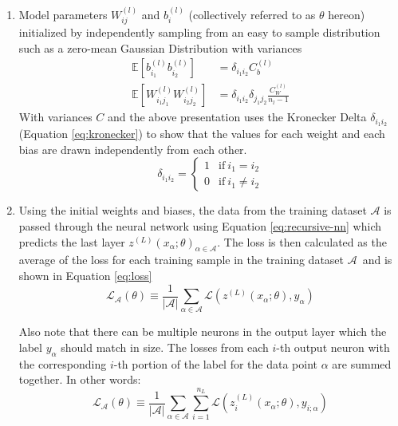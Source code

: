 \begin{enumerate}
    \item Model parameters $W_{ij}^{(l)}$ and $b_i^{(l)}$ (collectively referred to as $\theta$ hereon) initialized by independently sampling from an easy to sample distribution such as a zero-mean Gaussian Distribution with variances
    \begin{equation}
        \begin{split}
            \mathbb{E}[b_{i_1}^{(l)}b_{i_2}^{(l)}] &= \delta_{i_1 i_2} C_b^{(l)} \\
            \mathbb{E}[W_{i_1 j_1}^{(l)}W_{i_2 j_2}^{(l)}] &= \delta_{i_1 i_2} \delta_{j_1 j_2} \frac{C_W^{(l)}}{n_l - 1}
        \end{split}
    \end{equation}
    With variances $C$ and the above presentation uses the Kronecker Delta $\delta_{i_1 i_2}$ (Equation \ref{eq:kronecker}) to show that the values for each weight and each bias are drawn independently from each other.
    \begin{equation}
        \label{eq:kronecker}
        \delta_{i_1 i_2} = \begin{cases}
            1 & \text{if} \: i_1 = i_2 \\
            0 & \text{if} \: i_1 \neq i_2
        \end{cases}
    \end{equation}

    \item Using the initial weights and biases, the data from the training dataset $\mathcal{A}$ is passed through the neural network using Equation \ref{eq:recursive-nn} which predicts the last layer $z^{(L)}(x_\alpha;\theta)_{\alpha \in \mathcal{A}}$. The loss is then calculated as the average of the loss for each training sample in the training dataset $\mathcal{A}$\ and is shown in Equation \ref{eq:loss}     
    \begin{equation}
        \label{eq:loss}
        \mathcal{L}_{\mathcal{A}}(\theta) \equiv \frac{1}{|\mathcal{A}|} \sum_{\alpha \in \mathcal{A}}\mathcal{L}\left( z^{(L)}(x_\alpha;\theta), y_\alpha \right)
    \end{equation}

    Also note that there can be multiple neurons in the output layer which the label $y_\alpha$ should match in size. The losses from each $i$-th output neuron with the corresponding $i$-th portion of the label for the data point $\alpha$ are summed together. In other words:
    \begin{equation}
        \mathcal{L}_{\mathcal{A}}(\theta) \equiv \frac{1}{|\mathcal{A}|} \sum_{\alpha \in \mathcal{A}} \sum_{i=1}^{n_L} \mathcal{L}\left( z_i^{(L)}(x_\alpha;\theta), y_{i;\alpha} \right)
    \end{equation}



\end{enumerate}
